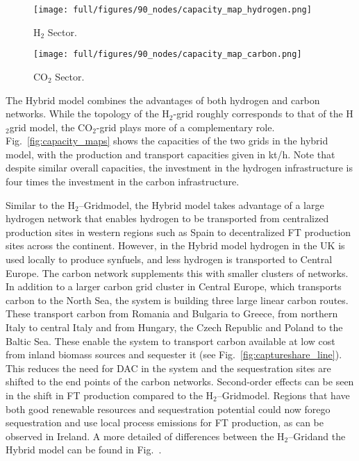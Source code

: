 \documentclass[twocolumn]{article}
\newcommand{\carbon}{CO$_2$}
\newcommand{\hydrogen}{H$_2$}
\newcommand{\hydrogengrid}{\hydrogen{}--Grid}
\begin{document}
\begin{figure*}[ht!]
    \centering
    \begin{subfigure}{.49\textwidth}
        \centering
        \texttt{[image: full/figures/90\_nodes/capacity\_map\_hydrogen.png]}
        \caption{\hydrogen{} Sector.}
        \label{fig:capacity_map_hydrogen_co2}
    \end{subfigure}
    \hfill
    \begin{subfigure}{.49\textwidth}
        \centering
        \texttt{[image: full/figures/90\_nodes/capacity\_map\_carbon.png]}
        \caption{\carbon{} Sector.}
        \label{fig:capacity_map_carbon_co2}
    \end{subfigure}%
    \caption{Optimal production and transport capacities of the carbon and hydrogen sector in a net-zero energy system in Europe with both \carbon{} and \hydrogen{} network expansion (Hybrid).
    }
    \label{fig:capacity_maps}
\end{figure*}


The Hybrid model combines the advantages of both hydrogen and carbon networks. While the topology of the \hydrogen{}-grid roughly corresponds to that of the \hydrogen grid model, the \carbon{}-grid plays more of a complementary role. Fig.~\ref{fig:capacity_maps} shows the capacities of the two grids in the hybrid model, with the production and transport capacities given in kt/h. Note that despite similar overall capacities, the investment in the hydrogen infrastructure is four times the investment in the carbon infrastructure.


Similar to the \hydrogengrid model, the Hybrid model takes advantage of a large hydrogen network that enables hydrogen to be transported from centralized production sites in western regions such as Spain to decentralized FT production sites across the continent. However, in the Hybrid model hydrogen in the UK is used locally to produce synfuels, and less hydrogen is transported to Central Europe.
The carbon network supplements this with smaller clusters of networks. In addition to a larger carbon grid cluster in Central Europe, which transports carbon to the North Sea, the system is building three large linear carbon routes. These transport carbon from Romania and Bulgaria to Greece, from northern Italy to central Italy and from Hungary, the Czech Republic and Poland to the Baltic Sea. These enable the system to transport carbon available at low cost from inland biomass sources and sequester it (see Fig.~\ref{fig:captureshare_line}). This reduces the need for DAC in the system and the sequestration sites are shifted to the end points of the carbon networks. Second-order effects can be seen in the shift in FT production compared to the \hydrogengrid model. Regions that have both good renewable resources and sequestration potential could now forego sequestration and use local process emissions for FT production, as can be observed in Ireland. A more detailed of differences between the \hydrogengrid and the Hybrid model can be found in Fig.~.
\end{document}

